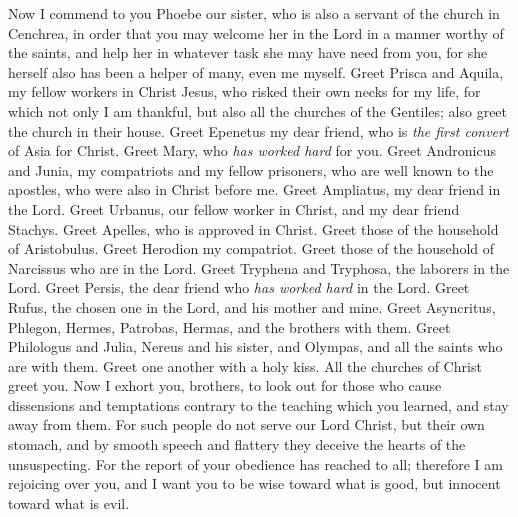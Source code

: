 \begin{biblechapter} %
 Now I commend to you Phoebe our sister, who is also a servant of the church in Cenchrea,
\verse in order that you may welcome her in the Lord in a manner worthy of the saints, and help her in whatever task she may have need from you, for she herself also has been a helper of many, even me myself.
\verse Greet Prisca and Aquila, my fellow workers in Christ Jesus,
\verse who risked their own necks for my life, for which not only I am thankful, but also all the churches of the Gentiles;
\verse also greet the church in their house. Greet Epenetus my dear friend, who is \textit{the first convert} of Asia for Christ.
\verse Greet Mary, who \textit{has worked hard} for you.
\verse Greet Andronicus and Junia, my compatriots and my fellow prisoners, who are well known to the apostles, who were also in Christ before me.
\verse Greet Ampliatus, my dear friend in the Lord.
\verse Greet Urbanus, our fellow worker in Christ, and my dear friend Stachys.
\verse Greet Apelles, who is approved in Christ. Greet those of the household of Aristobulus.
\verse Greet Herodion my compatriot. Greet those of the household of Narcissus who are in the Lord.
\verse Greet Tryphena and Tryphosa, the laborers in the Lord. Greet Persis, the dear friend who \textit{has worked hard} in the Lord.
\verse Greet Rufus, the chosen one in the Lord, and his mother and mine.
\verse Greet Asyncritus, Phlegon, Hermes, Patrobas, Hermas, and the brothers with them.
\verse Greet Philologus and Julia, Nereus and his sister, and Olympas, and all the saints who are with them.
\verse Greet one another with a holy kiss. All the churches of Christ greet you.
 Now I exhort you, brothers, to look out for those who cause dissensions and temptations contrary to the teaching which you learned, and stay away from them.
\verse For such people do not serve our Lord Christ, but their own stomach, and by smooth speech and flattery they deceive the hearts of the unsuspecting.
\verse For the report of your obedience has reached to all; therefore I am rejoicing over you, and I want you to be wise toward what is good, but innocent toward what is evil.

\end{biblechapter}
